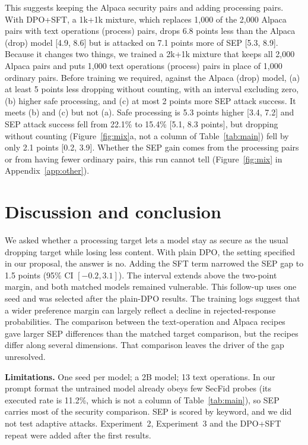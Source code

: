 \documentclass{article}
\begin{document}
This suggests keeping the Alpaca security pairs and adding processing pairs. With DPO+SFT, a 1k+1k mixture, which replaces 1,000 of the 2,000 Alpaca pairs with text operations (process) pairs, drops 6.8 points less than the Alpaca (drop) model [4.9, 8.6] but is attacked on 7.1 points more of SEP [5.3, 8.9]. Because it changes two things, we trained a 2k+1k mixture that keeps all 2,000 Alpaca pairs and puts 1,000 text operations (process) pairs in place of 1,000 ordinary pairs. Before training we required, against the Alpaca (drop) model, (a) at least 5 points less dropping without counting, with an interval excluding zero, (b) higher safe processing, and (c) at most 2 points more SEP attack success. It meets (b) and (c) but not (a). Safe processing is 5.3 points higher [3.4, 7.2] and SEP attack success fell from 22.1\% to 15.4\% [5.1, 8.3 points], but dropping without counting (Figure~\ref{fig:mix}a, not a column of Table~\ref{tab:main}) fell by only 2.1 points [0.2, 3.9]. Whether the SEP gain comes from the processing pairs or from having fewer ordinary pairs, this run cannot tell (Figure~\ref{fig:mix} in Appendix~\ref{app:other}).

\section{Discussion and conclusion}
\label{sec:discussion}

We asked whether a processing target lets a model stay as secure as the usual dropping target while losing less content. With plain DPO, the setting specified in our proposal, the answer is no. Adding the SFT term narrowed the SEP gap to 1.5 points (95\% CI $[-0.2, 3.1]$). The interval extends above the two-point margin, and both matched models remained vulnerable. This follow-up uses one seed and was selected after the plain-DPO results. The training logs suggest that a wider preference margin can largely reflect a decline in rejected-response probabilities. The comparison between the text-operation and Alpaca recipes gave larger SEP differences than the matched target comparison, but the recipes differ along several dimensions. That comparison leaves the driver of the gap unresolved.

\textbf{Limitations.} One seed per model; a 2B model; 13 text operations. In our prompt format the untrained model already obeys few SecFid probes (its executed rate is 11.2\%, which is not a column of Table~\ref{tab:main}), so SEP carries most of the security comparison. SEP is scored by keyword, and we did not test adaptive attacks. Experiment~2, Experiment~3 and the DPO+SFT repeat were added after the first results.
\end{document}
